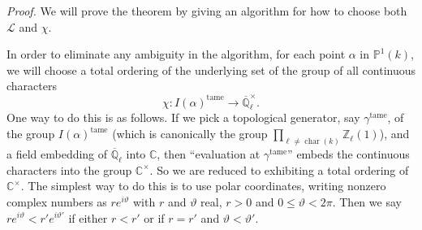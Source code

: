 \textit{Proof.} We will prove the theorem by giving an algorithm for how to
choose both \(\mathcal{L}\) and \(\chi\).

In order to eliminate any ambiguity in the algorithm, for each point \(\alpha\)
in \(\mathbb{P}^1(k)\), we will choose a total ordering of the underlying set
of the group of all continuous characters
\[
  \chi:I(\alpha)^{\mathrm{tame}}\to\overline{\mathbb{Q}}_\ell^\times.
\]
One way to do this is as follows. If we pick a topological generator, say
\(\gamma^{\mathrm{tame}}\), of the group \(I(\alpha)^{\mathrm{tame}}\) (which
is canonically the group
\(\prod_{\ell\neq\operatorname{char}(k)}\mathbb{Z}_\ell(1)\)), and a field
embedding of \(\overline{\mathbb{Q}}_\ell\) into \(\mathbb{C}\), then
``evaluation at \(\gamma^{\mathrm{tame}}\)'' embeds the continuous characters
into the group \(\mathbb{C}^\times\). So we are reduced to exhibiting a total
ordering of \(\mathbb{C}^\times\). The simplest way to do this is to use polar
coordinates, writing nonzero complex numbers as \(re^{i\vartheta}\) with \(r\)
and \(\vartheta\) real, \(r>0\) and \(0\leq \vartheta<2\pi\). Then we say
\(re^{i\vartheta}<r'e^{i\vartheta'}\) if either \(r<r'\) or if \(r=r'\) and
\(\vartheta<\vartheta'\).

